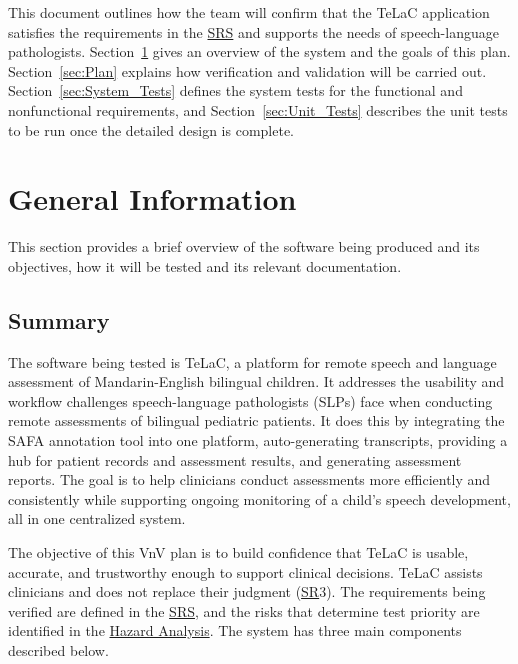 \documentclass[12pt, titlepage]{article}
\newcommand{\SRSLink}{\href{https://github.com/Nour-Fawaz/MacaBoca/blob/main/pdfs/SRS/SRS.pdf}{SRS}}
\newcommand{\HALink}{\href{https://github.com/Nour-Fawaz/MacaBoca/blob/main/pdfs/HazardAnalysis/HazardAnalysis.pdf}{Hazard Analysis}}
\newcommand{\srssr}[1]{\href{https://github.com/Nour-Fawaz/MacaBoca/blob/main/pdfs/SRS/SRS.pdf}{SR}}
\renewcommand{\_}{\oldunderscore\allowbreak}
\begin{document}
\newpage


This document outlines how the team will confirm that the TeLaC application satisfies the requirements in the \SRSLink{} and supports the needs of speech-language pathologists.
Section~\ref{sec:General_Information} gives an overview of the system and the goals of this plan.
Section~\ref{sec:Plan} explains how verification and validation will be carried out.
Section~\ref{sec:System_Tests} defines the system tests for the functional and nonfunctional requirements, and Section~\ref{sec:Unit_Tests} describes the unit tests to be run once the detailed design is complete.

\section{General Information} \label{sec:General_Information}
This section provides a brief overview of the software being produced and its objectives, how it will be tested and its relevant documentation.

\subsection{Summary}
The software being tested is TeLaC, a platform for remote speech and language assessment of Mandarin-English bilingual children. It addresses the usability and workflow challenges speech-language pathologists (SLPs) face when conducting remote assessments of bilingual pediatric patients. 
It does this by integrating the SAFA annotation tool into one platform, auto-generating transcripts, providing a hub for patient records and assessment results, and generating assessment reports. The goal is to help clinicians conduct assessments more efficiently and consistently while supporting ongoing monitoring of a child’s speech development, all in one centralized system.

The objective of this VnV plan is to build confidence that TeLaC is usable, accurate, and trustworthy enough to support clinical decisions. 
TeLaC assists clinicians and does not replace their judgment (\srssr*{3}). 
The requirements being verified are defined in the \SRSLink, and the risks that determine test priority are identified in the \HALink. 
The system has three main components described below.
\end{document}
